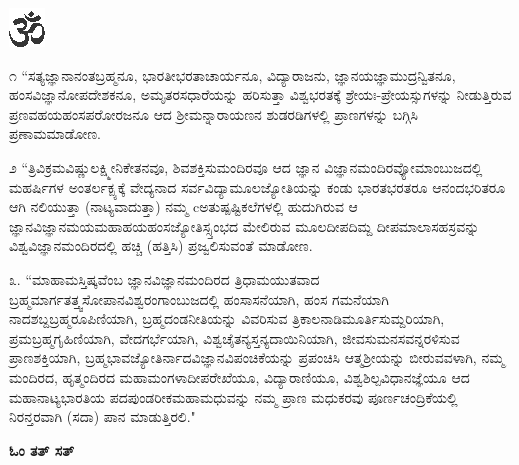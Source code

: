 
\begin{center}
{\includegraphics[scale=1.5]{om.eps}}
\end{center}

೧ ``ಸತ್ಯಜ್ಞಾನಾನಂತಬ್ರಹ್ಮನೂ, ಭಾರತೀಭರತಾಚಾರ್ಯನೂ, ವಿದ್ಯಾರಾಜನು, ಜ್ಞಾನಯಜ್ಞಾಮುದ್ರನ್ವಿತನೂ, ಹಂಸವಿಜ್ಞಾನೋಪದೇಶಕನೂ, ಅಮೃತರಸಧಾರೆಯನ್ನು ಹರಿಸುತ್ತಾ ವಿಶ್ವಭರತಕ್ಕೆ  ಶ್ರೇಯಃ-ಪ್ರೇಯಸ್ಸುಗಳನ್ನು ನೀಡುತ್ತಿರುವ ಪ್ರಣವಹಯಹಂಸಪರೋರಜನೂ ಆದ ಶ್ರೀಮನ್ನಾರಾಯಣನ ಶುಡರಡಿಗಳಲ್ಲಿ ಪ್ರಾಣಗಳನ್ನು ಬಗ್ಗಿಸಿ ಪ್ರಣಾಮಮಾಡೋಣ.

೨ ``ತ್ರಿವಿಕ್ರಮವಿಷ್ಣುಲಕ್ಷ್ಮೀನಿಕೇತನವೂ, ಶಿವಶಕ್ತಿಸುಮಂದಿರವೂ ಆದ ಜ್ಞಾನ ವಿಜ್ಞಾನಮಂದಿರವ್ಯೋಮಾಂಬುಜದಲ್ಲಿ ಮಹರ್ಷಿಗಳ ಅಂತರ್ಲಕ್ಪ್ಯಕ್ಕೆ ವೇದ್ಯನಾದ ಸರ್ವವಿದ್ಯಾಮೂಲಜ್ಯೋತಿಯನ್ನು ಕಂಡು ಭಾರತಭರತರೂ ಆನಂದಭರಿತರೂ ಆಗಿ ನಲಿಯುತ್ತಾ (ನಾಟ್ಯವಾದುತ್ತಾ) ನಮ್ಮ cಅತುಷ್ಪಷ್ಟಿಕಲೆಗಳಲ್ಲಿ ಹುದುಗಿರುವ ಆ ಜ್ಞಾನವಿಜ್ಞಾನಮಯಮಹಾಹಯಹಂಸಜ್ಯೋತಿಸ್ಸ್ತಂಭದ ಮೇಲಿರುವ ಮೂಲದೀಪದಿಮ್ದ ದೀಪಮಾಲಾಸಹಸ್ರವನ್ನು ವಿಶ್ವವಿಜ್ಞಾನಮಂದಿರದಲ್ಲಿ ಹಚ್ಚಿ (ಹತ್ತಿಸಿ) ಪ್ರಜ್ವಲಿಸುವಂತೆ ಮಾಡೋಣ.

೩. ``ಮಾಹಾಮಸ್ತಿಷ್ಕವೆಂಬ ಜ್ಞಾನವಿಜ್ಞಾನಮಂದಿರದ ತ್ರಿಧಾಮಯುತವಾದ ಬ್ರಹ್ಮಮಾರ್ಗತತ್ತ್ವಸೋಪಾನವಿಶ್ವರಂಗಾಂಬುಜದಲ್ಲಿ ಹಂಸಾಸನೆಯಾಗಿ, ಹಂಸ ಗಮನೆಯಾಗಿ ನಾದಶಬ್ದಬ್ರಹ್ಮರೂಪಿಣಿಯಾಗಿ, ಬ್ರಹ್ಮದಂಡನೀತಿಯನ್ನು ವಿವರಿಸುವ ತ್ರಿಕಾಲನಾಡಿಮೂರ್ತಿಸುಮ್ದರಿಯಾಗಿ, ಪ್ರಮಬ್ರಹ್ಮಗೃಹಿಣಿಯಾಗಿ, ವೇದಗರ್ಭೆಯಾಗಿ, ವಿಶ್ವಚೈತನ್ಯಸ್ತನ್ಯದಾಯಿನಿಯಾಗಿ, ಜೀವಸುಮನಸವನ್ನರಳಿಸುವ ಪ್ರಾಣಶಕ್ತಿಯಾಗಿ, ಬ್ರಹ್ಮಭಾವಜ್ಯೋತಿರ್ನಾದವಿಜ್ಞಾನವಿಪಂಚಿಕೆಯನ್ನು ಪ್ರಪಂಚಿಸಿ ಆತ್ಮಶ್ರೀಯನ್ನು ಬೀರುವವಳಾಗಿ, ನಮ್ಮ ಮಂದಿರದ, ಹೃತ್ಮಂದಿರದ ಮಹಾಮಂಗಳಾದೀಪರೇಖೆಯೂ, ವಿದ್ಯಾರಾಣಿಯೂ, ವಿಶ್ವಶಿಲ್ಪವಿಧಾನಜ್ಞೆಯೂ ಆದ ಮಹಾನಾಟ್ಯಭಾರತಿಯ ಪದಪುಂಡರೀಕಮಹಾಮಧುವನ್ನು ನಮ್ಮ ಪ್ರಾಣ ಮಧುಕರವು ಪೂರ್ಣಚಂದ್ರಿಕೆಯಲ್ಲಿ ನಿರನ್ತರವಾಗಿ (ಸದಾ) ಪಾನ ಮಾಡುತ್ತಿರಲಿ."

\vskip 20pt
\centerline{{\bf ಓಂ ತತ್ ಸತ್}}

